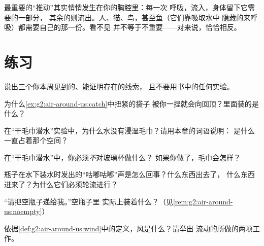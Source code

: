 \begin{remark}[空气很宝贵]\label{rem:g2:air-around-us:breathe}
最重要的“推动”其实悄悄发生在你的胸腔里：每一次
呼吸，流入，身体留下它需要的一部分，
其余的则流出。人、猫、鸟，甚至鱼（它们靠吸取水中
隐藏的来呼吸）都需要自己的那一份。看不见
并不等于不重要——对来说，恰恰相反。
\end{remark}

\section{练习}

\begin{exercise}[$\star$]\label{exo:g2:air-around-us:1}
说出三个你本周见到的、能证明存在的线索，
且不要用书中的任何实验。
\end{exercise}

\begin{exercise}[$\star$]\label{exo:g2:air-around-us:2}
为什么\cref{ex:g2:air-around-us:catch}中扭紧的袋子
被你一捏就会向回顶？里面装的是什么？
\end{exercise}

\begin{exercise}[$\star$]\label{exo:g2:air-around-us:3}
在“干毛巾潜水”实验中，为什么水没有浸湿毛巾？请用本章的词语说明：
是什么一直占着那个空间？
\end{exercise}

\begin{exercise}[$\star$]\label{exo:g2:air-around-us:4}
在“干毛巾潜水”中，你必须\emph{不}对玻璃杯做什么？
如果你做了，毛巾会怎样？
\end{exercise}

\begin{exercise}[$\star$]\label{exo:g2:air-around-us:5}
瓶子在水下装水时发出的“咕嘟咕嘟”声是怎么回事？什么东西出去了，
什么东西进来了？为什么它们必须轮流进行？
\end{exercise}

\begin{exercise}[$\star$]\label{exo:g2:air-around-us:6}
“请把空瓶子递给我。”空瓶子里
实际上装着什么？（见\cref{rem:g2:air-around-us:noempty}）
\end{exercise}

\begin{exercise}[$\star$]\label{exo:g2:air-around-us:7}
依据\cref{def:g2:air-around-us:wind}中的定义，风是什么？请举出
流动的所做的两项工作。
\end{exercise}


